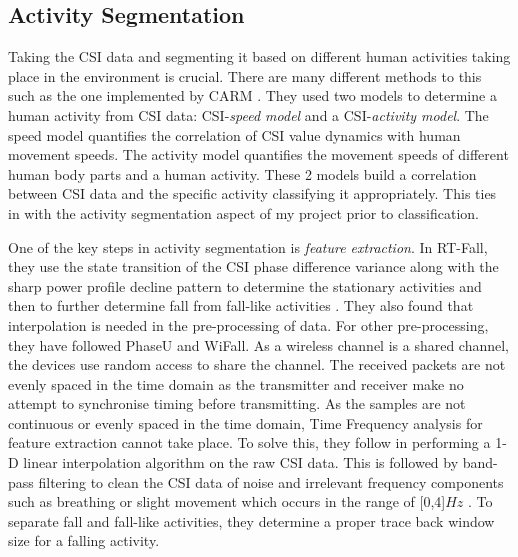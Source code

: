 \subsection{Activity Segmentation}
Taking the CSI data and segmenting it based on different human activities taking place in the environment is crucial. There are many different methods to this such as the one implemented by CARM \citep{CARM}. They used two models to determine a human activity from CSI data: CSI-\textit{speed model} and a CSI-\textit{activity model}. The speed model quantifies the correlation of CSI value dynamics with human movement speeds. The activity model quantifies the movement speeds of different human body parts and a human activity. These 2 models build a correlation between CSI data and the specific activity classifying it appropriately. This ties in with the activity segmentation aspect of my project prior to classification. \par
One of the key steps in activity segmentation is \textit{feature extraction}. In RT-Fall, they use the state transition of the CSI phase difference variance along with the sharp power profile decline pattern to determine the stationary activities and then to further determine fall from fall-like activities \citep{RTFall}. They also found that interpolation is needed in the pre-processing of data. For other pre-processing, they have followed PhaseU and WiFall. As a wireless channel is a shared channel, the devices use random access to share the channel. The received packets are not evenly spaced in the time domain as the transmitter and receiver make no attempt to synchronise timing before transmitting. As the samples are not continuous or evenly spaced in the time domain, Time Frequency analysis for feature extraction cannot take place. To solve this, they follow \cite{gestureCSI} in performing a 1-D linear interpolation algorithm on the raw CSI data. This is followed by band-pass filtering to clean the CSI data of noise and irrelevant frequency components such as breathing or slight movement which occurs in the range of [0,4]$Hz$ \citep{RTFall}. To separate fall and fall-like activities, they determine a proper trace back window size for a falling activity. 
